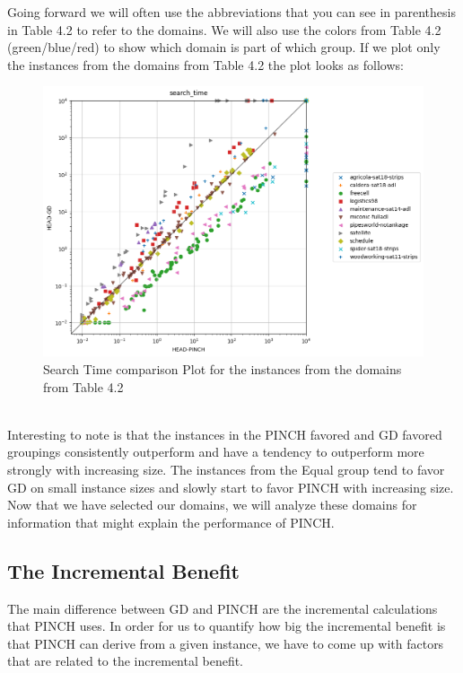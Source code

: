 \newpage
Going forward we will often use the abbreviations that you can see in parenthesis in Table 4.2 to refer to the domains. We will also use the colors from Table 4.2 (green/blue/red) to show which domain is part of which group. If we plot only the instances from the domains from Table 4.2 the plot looks as follows:\\
\begin{figure}
    \centering
    \includegraphics[width=1\columnwidth]{plotSearchDomainGroups.png}
    \caption{Search Time comparison Plot for the instances from the domains from Table 4.2}
    \label{fig:my_label}
\end{figure}\\
Interesting to note is that the instances in the PINCH favored and GD favored groupings consistently outperform and have a tendency to outperform more strongly with increasing size. The instances from the Equal group tend to favor GD on small instance sizes and slowly start to favor PINCH with increasing size. \\

Now that we have selected our domains, we will analyze these domains for information that might explain the performance of PINCH.

\subsection{The Incremental Benefit}
The main difference between GD and PINCH are the incremental calculations that PINCH uses. In order for us to quantify how big the incremental benefit is that PINCH can derive from a given instance, we have to come up with factors that are related to the incremental benefit.\\


